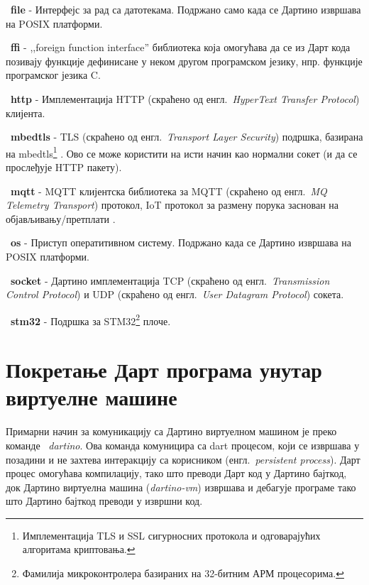 \documentclass[12pt,oneside]{memoir}
\begin{document}
\begin{description}

\item ~\textbf{file} - Интерфејс за рад са датотекама. Подржано само када се Дартино извршава на POSIX платформи.

\item ~\textbf{ffi} - ,,foreign function interface'' библиотека која омогућава да се из Дарт кода позивају функције дефинисане у неком другом програмском језику, нпр. функције програмског језика C.

\item ~\textbf{http} - Имплементација HTTP (скраћено од енгл.~\textit{HyperText Transfer Protocol}) клијента.

\item ~\textbf{mbedtls} - TLS (скраћено од енгл.~\textit{Transport Layer Security}) подршка, базирана на mbedtls\footnote{Имплементација TLS и SSL сигурносних протокола и одговарајућих алгоритама криптовања.} \cite{mbed}.
Ово се може користити на исти начин као нормални сокет (и да се прослеђује HTTP пакету).

\item ~\textbf{mqtt} - MQTT клијентска библиотека за MQTT (скраћено од  енгл.~\textit{MQ Telemetry Transport}) протокол, IoT протокол за размену порука заснован на објављивању/претплати \cite{mqtt}.

\item ~\textbf{os} - Приступ оператитивном систему. Подржано када се Дартино извршава на POSIX платформи.

\item ~\textbf{socket} - Дартино имплементација TCP (скраћено од енгл.~\textit{Transmission Control Protocol}) и UDP (скраћено од енгл.~\textit{User Datagram Protocol}) сокета.

\item ~\textbf{stm32} - Подршка за STM32\footnote{Фамилија микроконтролера базираних на 32-битним АРМ процесорима.} плоче.

\end{description}

\section{Покретање Дарт програма унутар виртуелне машине}
\label{sec:pokretanje}

Примарни начин за комуникацију са Дартино виртуелном машином је преко команде ~\textit{dartino}. Ова команда комуницира са dart процесом, који се извршава у позадини и не захтева интеракцију са корисником (енгл.~\textit{persistent process}). Дарт процес омогућава компилацију, тако што преводи Дарт код у Дартино бајткод, док Дартино виртуелна машина (\textit{dartino-vm}) извршава и дебагује програме тако што Дартино бајткод преводи у извршни код.\\
\end{document}
